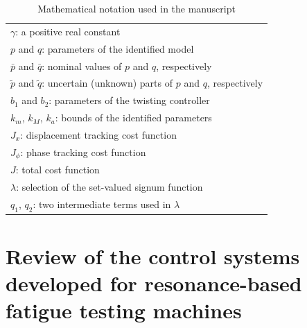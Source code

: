 \documentclass[preprint,12pt]{elsarticle}
\begin{document}
\begin{table}
\begin{tabular}{|l|}
$\gamma$: a positive real constant \\
$p$ and $q$: parameters of the identified model \\
$\bar{p}$ and $\bar{q}$: nominal values of $p$ and $q$, respectively \\
$\tilde{p}$ and $\tilde{q}$: uncertain (unknown) parts of $p$ and $q$, respectively \\
$b_1$ and $b_2$: parameters of the twisting controller \\
$k_m$, $k_M$, $k_a$: bounds of the identified parameters \\
$J_x$: displacement tracking cost function \\
 $J_\phi$: phase tracking cost function \\
$J$: total cost function \\
$\lambda$: selection of the set-valued signum function \\
$q_1$, $q_2$: two intermediate terms used in $\lambda$ \\
\hline
    \end{tabular}
    \vspace{0.1cm}
    \caption{Mathematical notation used in the manuscript}
    \label{T_notation}
\end{table}


\section{Review of the control systems developed for resonance-based fatigue testing machines} \label{S_control_system}
\end{document}
